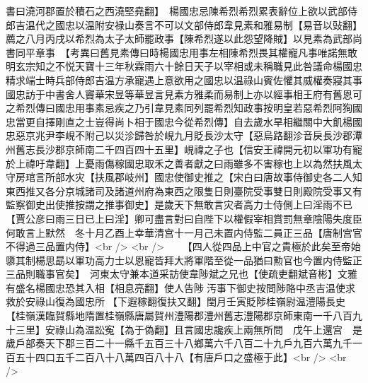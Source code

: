 書曰澆河郡置於積石之西澆堅堯翻】　楊國忠忌陳希烈希烈累表辭位上欲以武部侍郎吉温代之國忠以温附安禄山奏言不可以文部侍郎韋見素和雅易制【易音以䜴翻】薦之八月丙戌以希烈為太子太師罷政事【陳希烈遂以此怨望降賊】以見素為武部尚書同平章事　【考異曰舊見素傳曰時楊國忠用事左相陳希烈畏其權寵凡事唯諾無敢明玄宗知之不悦天寶十三年秋霖雨六十餘日天子以宰相或未稱職見此咎議命楊國忠精求端士時兵部侍郎吉温方承寵遇上意欲用之國忠以温祿山賓佐懼其威權奏寢其事國忠訪于中書舍人竇華宋昱等華昱言見素方雅柔而易制上亦以經事相王府有舊恩可之希烈傳曰國忠用事素忌疾之乃引韋見素同列罷希烈知政事按明皇若惡希烈阿狥國忠當更自擇剛直之士豈得尚卜相于國忠今從希烈傳】自去歲水旱相繼關中大飢楊國忠惡京兆尹李峴不附己以災沴歸咎於峴九月貶長沙太守【惡烏路翻沴音戾長沙郡潭州舊志長沙郡京師南二千四百四十五里】峴禕之子也【信安王禕開元初以軍功有寵於上禕吁韋翻】上憂雨傷稼國忠取禾之善者獻之曰雨雖多不害稼也上以為然扶風太守房琯言所部水灾【扶風郡岐州】國忠使御史推之【宋白曰唐故事侍御史各二人知東西推又各分京城諸司及諸道州府為東西之限隻日則臺院受事雙日則殿院受事又有監察御史出使推按謂之推事御史】是歲天下無敢言灾者高力士侍側上曰淫雨不已【賈公彦曰雨三日已上曰淫】卿可盡言對曰自陛下以權假宰相賞罰無章陰陽失度臣何敢言上默然　冬十月乙酉上幸華清宫十一月己未置内侍監二員正三品【唐制宫官不得過三品置内侍】<br />
<br />
　　【四人從四品上中官之貴極於此矣至帝始隳其制楊思勗以軍功高力士以恩寵皆拜大將軍階至從一品猶曰勲官也今置内侍監正三品則職事官矣】　河東太守兼本道采訪使韋陟斌之兄也【使疏吏翻斌音彬】文雅有盛名楊國忠恐其入相【相息亮翻】使人告陟汚事下御史按問陟賂中丞吉温使求救於安祿山復為國忠所【下遐稼翻復扶又翻】閏月壬寅貶陟桂嶺尉温澧陽長史【桂嶺漢臨賀縣地隋置桂嶺縣唐屬賀州澧陽郡澧州舊志澧陽郡京師東南一千八百九十三里】安祿山為温訟寃【為于偽翻】且言國忠讒疾上兩無所問　戊午上還宫　是歲戶部奏天下郡三百二十一縣千五百三十八鄉萬六千八百二十九戶九百六萬九千一百五十四口五千二百八十八萬四百八十八【有唐戶口之盛極于此】<br />
<br />
